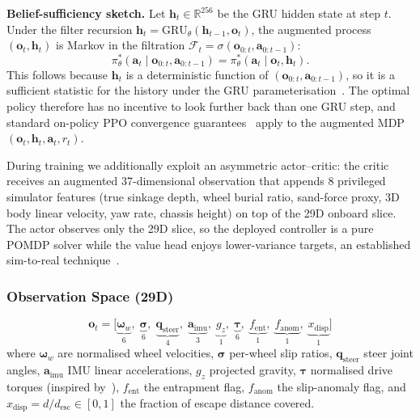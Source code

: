 \documentclass[conference]{IEEEtran}
\begin{document}
\textbf{Belief-sufficiency sketch.}
Let $\mathbf{h}_t \in \mathbb{R}^{256}$ be the GRU hidden state at step $t$.
Under the filter recursion
$\mathbf{h}_t = \text{GRU}_\theta(\mathbf{h}_{t-1}, \mathbf{o}_t)$,
the augmented process $(\mathbf{o}_t, \mathbf{h}_t)$ is Markov in the
filtration $\mathcal{F}_t = \sigma(\mathbf{o}_{0:t}, \mathbf{a}_{0:t-1})$:
\begin{equation}
  \pi^*_\theta(\mathbf{a}_t \mid \mathbf{o}_{0:t}, \mathbf{a}_{0:t-1})
  = \pi^*_\theta(\mathbf{a}_t \mid \mathbf{o}_t, \mathbf{h}_t).
  \label{eq:belief-markov}
\end{equation}
This follows because $\mathbf{h}_t$ is a deterministic function of
$(\mathbf{o}_{0:t}, \mathbf{a}_{0:t-1})$, so it is a sufficient statistic for
the history under the GRU parameterisation~\cite{cho2014gru}.
The optimal policy therefore has no incentive to look further back than one GRU
step, and standard on-policy PPO convergence guarantees~\cite{schulman2017ppo}
apply to the augmented MDP $(\mathbf{o}_t, \mathbf{h}_t, \mathbf{a}_t,
r_t)$.

During training we additionally exploit an asymmetric actor--critic: the critic
receives an augmented 37-dimensional observation that appends 8 privileged
simulator features (true sinkage depth, wheel burial ratio, sand-force proxy,
3D body linear velocity, yaw rate, chassis height) on top of the 29D onboard
slice. The actor observes only the 29D slice, so the deployed controller is a
pure POMDP solver while the value head enjoys lower-variance targets, an
established sim-to-real technique~\cite{kumar2021rma,lee2020quadruped}.

\subsubsection{Observation Space (29D)}
\label{sec:obs}
\begin{equation*}
  \mathbf{o}_t = \bigl[\underbrace{\boldsymbol{\omega}_w}_{6},\;
                        \underbrace{\boldsymbol{\sigma}}_{6},\;
                        \underbrace{\mathbf{q}_{\text{steer}}}_{4},\;
                        \underbrace{\mathbf{a}_{\text{imu}}}_{3},\;
                        \underbrace{g_z}_{1},\;
                        \underbrace{\boldsymbol{\tau}}_{6},\;
                        \underbrace{f_{\text{ent}}}_{1},\;
                        \underbrace{f_{\text{anom}}}_{1},\;
                        \underbrace{x_{\text{disp}}}_{1}\bigr]
\end{equation*}
where $\boldsymbol{\omega}_w$ are normalised wheel velocities, $\boldsymbol{\sigma}$
per-wheel slip ratios, $\mathbf{q}_{\text{steer}}$ steer joint angles,
$\mathbf{a}_{\text{imu}}$ IMU linear accelerations, $g_z$ projected gravity,
$\boldsymbol{\tau}$ normalised drive torques (inspired by~\cite{bi2026escape}),
$f_\text{ent}$ the entrapment flag, $f_\text{anom}$ the slip-anomaly flag, and
$x_\text{disp} = d/d_\text{esc} \in [0,1]$ the fraction of escape distance
covered.
\end{document}
